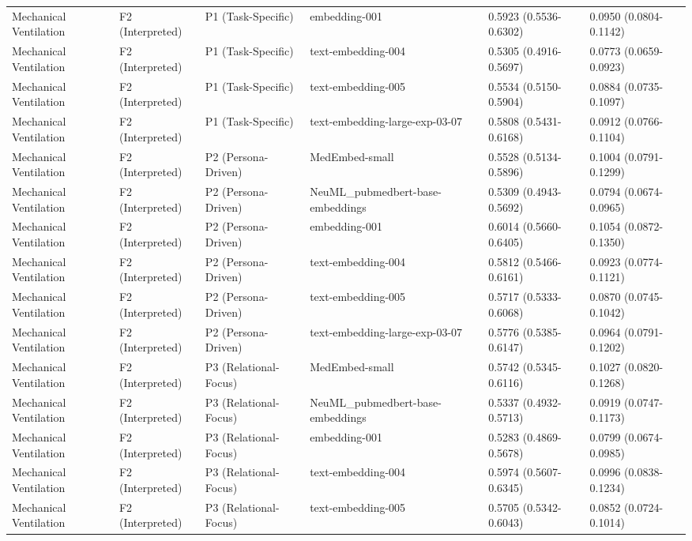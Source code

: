 \documentclass[border=0pt]{standalone}
\begin{document}
\begin{adjustbox}{width=\textwidth}
\begin{tabular}{llllll}
Mechanical Ventilation & F2 (Interpreted) & P1 (Task-Specific) & embedding-001 & 0.5923 (0.5536-0.6302) & 0.0950 (0.0804-0.1142) \\
Mechanical Ventilation & F2 (Interpreted) & P1 (Task-Specific) & text-embedding-004 & 0.5305 (0.4916-0.5697) & 0.0773 (0.0659-0.0923) \\
Mechanical Ventilation & F2 (Interpreted) & P1 (Task-Specific) & text-embedding-005 & 0.5534 (0.5150-0.5904) & 0.0884 (0.0735-0.1097) \\
Mechanical Ventilation & F2 (Interpreted) & P1 (Task-Specific) & text-embedding-large-exp-03-07 & 0.5808 (0.5431-0.6168) & 0.0912 (0.0766-0.1104) \\
Mechanical Ventilation & F2 (Interpreted) & P2 (Persona-Driven) & MedEmbed-small & 0.5528 (0.5134-0.5896) & 0.1004 (0.0791-0.1299) \\
Mechanical Ventilation & F2 (Interpreted) & P2 (Persona-Driven) & NeuML\_pubmedbert-base-embeddings & 0.5309 (0.4943-0.5692) & 0.0794 (0.0674-0.0965) \\
Mechanical Ventilation & F2 (Interpreted) & P2 (Persona-Driven) & embedding-001 & 0.6014 (0.5660-0.6405) & 0.1054 (0.0872-0.1350) \\
Mechanical Ventilation & F2 (Interpreted) & P2 (Persona-Driven) & text-embedding-004 & 0.5812 (0.5466-0.6161) & 0.0923 (0.0774-0.1121) \\
Mechanical Ventilation & F2 (Interpreted) & P2 (Persona-Driven) & text-embedding-005 & 0.5717 (0.5333-0.6068) & 0.0870 (0.0745-0.1042) \\
Mechanical Ventilation & F2 (Interpreted) & P2 (Persona-Driven) & text-embedding-large-exp-03-07 & 0.5776 (0.5385-0.6147) & 0.0964 (0.0791-0.1202) \\
Mechanical Ventilation & F2 (Interpreted) & P3 (Relational-Focus) & MedEmbed-small & 0.5742 (0.5345-0.6116) & 0.1027 (0.0820-0.1268) \\
Mechanical Ventilation & F2 (Interpreted) & P3 (Relational-Focus) & NeuML\_pubmedbert-base-embeddings & 0.5337 (0.4932-0.5713) & 0.0919 (0.0747-0.1173) \\
Mechanical Ventilation & F2 (Interpreted) & P3 (Relational-Focus) & embedding-001 & 0.5283 (0.4869-0.5678) & 0.0799 (0.0674-0.0985) \\
Mechanical Ventilation & F2 (Interpreted) & P3 (Relational-Focus) & text-embedding-004 & 0.5974 (0.5607-0.6345) & 0.0996 (0.0838-0.1234) \\
Mechanical Ventilation & F2 (Interpreted) & P3 (Relational-Focus) & text-embedding-005 & 0.5705 (0.5342-0.6043) & 0.0852 (0.0724-0.1014) \\

\end{tabular}
\end{adjustbox}
\end{document}
